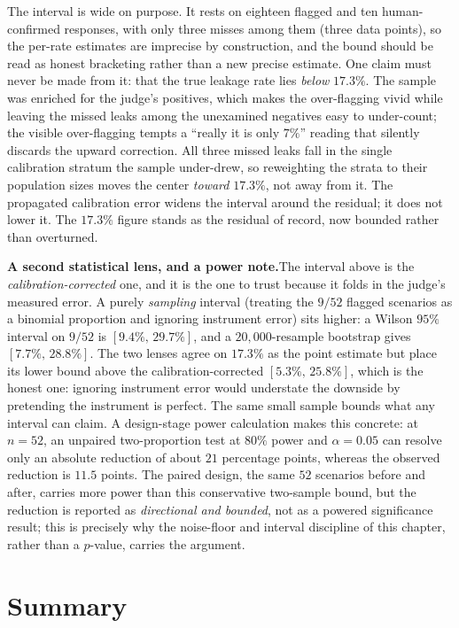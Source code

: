 \documentclass[12pt,a4paper]{report}
\begin{document}
The interval is wide on purpose. It rests on eighteen flagged and ten human-confirmed
responses, with only three misses among them (three data points), so the per-rate estimates
are imprecise by construction, and the bound should be read as honest bracketing rather than a
new precise estimate. One claim must never be made from it: that the true leakage rate lies
\emph{below} $17.3\%$. The sample was enriched for the judge's positives, which makes the
over-flagging vivid while leaving the missed leaks among the unexamined negatives easy to
under-count; the visible over-flagging tempts a ``really it is only $7\%$'' reading that
silently discards the upward correction. All three missed leaks fall in the single
calibration stratum the sample under-drew, so reweighting the strata to their population sizes
moves the center \emph{toward} $17.3\%$, not away from it. The propagated calibration error
widens the interval around the residual; it does not lower it. The $17.3\%$ figure stands as
the residual of record, now bounded rather than overturned.

\textbf{A second statistical lens, and a power note.}\quad The interval above is the
\emph{calibration-corrected} one, and it is the one to trust because it folds in the judge's measured
error. A purely \emph{sampling} interval (treating the $9/52$ flagged scenarios as a binomial
proportion and ignoring instrument error) sits higher: a Wilson $95\%$ interval on $9/52$ is
$[9.4\%,\,29.7\%]$, and a $20{,}000$-resample bootstrap gives $[7.7\%,\,28.8\%]$. The two lenses agree
on $17.3\%$ as the point estimate but place its lower bound above the calibration-corrected
$[5.3\%,\,25.8\%]$, which is the honest one: ignoring instrument error would understate the downside by
pretending the instrument is perfect. The same small sample bounds what any interval can claim. A
design-stage power calculation makes this concrete: at $n = 52$, an unpaired two-proportion test at
$80\%$ power and $\alpha = 0.05$ can resolve only an absolute reduction of about $21$ percentage
points, whereas the observed reduction is $11.5$ points. The paired design, the same $52$ scenarios
before and after, carries more power than this conservative two-sample bound, but the reduction is
reported as \emph{directional and bounded}, not as a powered significance result; this is precisely
why the noise-floor and interval discipline of this chapter, rather than a $p$-value, carries the
argument.

\section{Summary}
\label{sec:ch5-summary}
\end{document}
